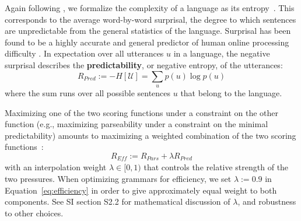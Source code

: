 \documentclass[9pt,twocolumn,twoside,lineno]{pnas-new}
\newcommand{\key}[1]{\textbf{#1}}
\begin{document}
{Again following \cite{ferreri2003least}, we formalize the complexity of a language as its entropy~\cite{ferreri2003least,ferrericancho2007global,futrell2017memory}.
This corresponds to the average word-by-word surprisal, the degree to which sentences are unpredictable from the general statistics of the language.
Surprisal has been found to be a highly accurate and general predictor of human online processing difficulty \cite{hale2001probabilistic,levy2008expectation,smith2013effect}.
In expectation over all utterances $u$ in a language, the negative surprisal describes the \key{predictability}, or negative entropy, of the utterances:
\begin{equation}
	R_{Pred} := - H[\mathcal{U}] = \sum_{u} p(u) \log p(u)
\end{equation}
where the sum runs over all possible sentences $u$ that belong to the language.

Maximizing one of the two scoring functions under a constraint on the other function (e.g., maximizing parseability under a constraint on the minimal predictability) amounts to maximizing a weighted combination of the two scoring functions~\cite{ferreri2003least,zaslavsky2018efficient}:
\begin{equation}\label{eq:efficiency}
	R_{\textit{Eff}} := R_{\textit{Pars}} + \lambda R_\textit{Pred}
\end{equation}
with an interpolation weight $\lambda \in [0,1)$ that controls the relative strength of the two pressures.
When optimizing grammars for efficiency, we set $\lambda := 0.9$ in Equation~\ref{eq:efficiency} in order to give approximately equal weight to both components.
See SI section S2.2 for mathematical discussion of $\lambda$, and robustness to other choices.

}
\end{document}
